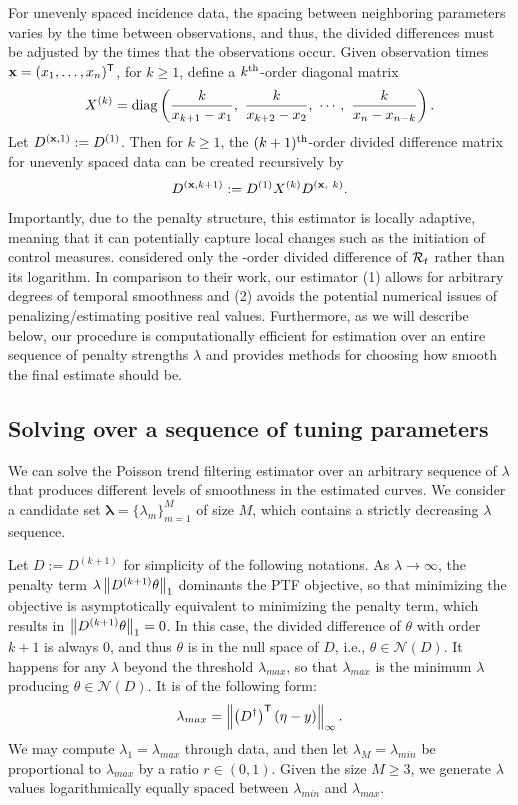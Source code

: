 For unevenly spaced incidence data, the spacing between neighboring parameters
varies by the time between observations, and thus, the divided differences must
be adjusted by the times that the observations occur.
Given observation times $\mathbf{x} = (x_1,\dots,x_n)^{\mathsf{T}}$, for $k \geq 1$, define a
$k^{\textnormal{th}}$-order diagonal matrix $$X^{(k)} = \diag \lr{\frac{k}{x_{k+1} - x_1},\ 
\frac{k}{x_{k+2} - x_2},\ \cdots,\ \frac{k}{x_n - x_{n-k}} }.$$ 
Let $D^{(\mathbf{x},1)} :=
D^{(1)}$. Then for $k\geq 1$, the $(k+1)^{\textnormal{th}}$-order divided difference matrix
for unevenly spaced data can be created recursively by
$$D^{(\bfx, k+1)} := D^{(1)} X^{(k)} D^{(\bfx,\ k)}.$$ 

Importantly, due to the penalty structure, this estimator is locally adaptive,
meaning that it can potentially capture local changes such as the initiation of
control measures. \cite{abry2020spatial,pascal2022nonsmooth} considered only the
\second-order divided difference of $\mathcal{R}_t$ rather than its logarithm. In
comparison to their work, our estimator (1) allows for arbitrary degrees of
temporal smoothness and (2) avoids the potential numerical issues of
penalizing/estimating positive real values. Furthermore, as we will describe
below, our procedure is computationally efficient for estimation over an entire
sequence of penalty strengths $\lambda$ and provides methods for choosing how
smooth the final estimate should be.


\subsection{Solving over a sequence of tuning parameters}
\label{sec:candidate-set}

We can solve the Poisson trend filtering estimator over an arbitrary sequence of 
$\lambda$ that produces different levels of smoothness in the estimated curves. 
We consider a candidate set $\boldsymbol{\lambda} = \{\lambda_m\}_{m=1}^M$ of 
size $M$, which contains a strictly decreasing $\lambda$ sequence.%

Let $D := D^{(k+1)}$ for simplicity of the following notations. 
As $\lambda \to\infty$, the penalty term $\lambda \left\lVert D^{(k+1)}\theta \right\rVert_1$ dominants 
the PTF objective, so that minimizing the objective is asymptotically equivalent to 
minimizing the penalty term, which results in $\left\lVert D^{(k+1)}\theta \right\rVert_1 = 0$. 
In this case, the divided difference of $\theta$ with order $k+1$ is always $0$, 
and thus $\theta$ is in the null space of $D$, i.e., $\theta\in\mathcal{N}(D)$. 
It happens for any $\lambda$ beyond the threshold $\lambda_{max}$, so that 
$\lambda_{max}$ is the minimum $\lambda$ producing $\theta\in\mathcal{N}(D)$. 
It is of the following form: $$\lambda_{max} = \left\lVert \left(D^{\dagger}\right)^{\mathsf{T}} \left(\eta - y\right) \right\rVert_{\infty}.$$
We may compute $\lambda_1 = \lambda_{max}$ through data, and then let 
$\lambda_M = \lambda_{min}$ be proportional to $\lambda_{max}$ by a ratio $r \in (0,1)$. 
Given the size $M\geq 3$, we generate $\lambda$ values logarithmically equally spaced between 
$\lambda_{min}$ and $\lambda_{max}$. 

